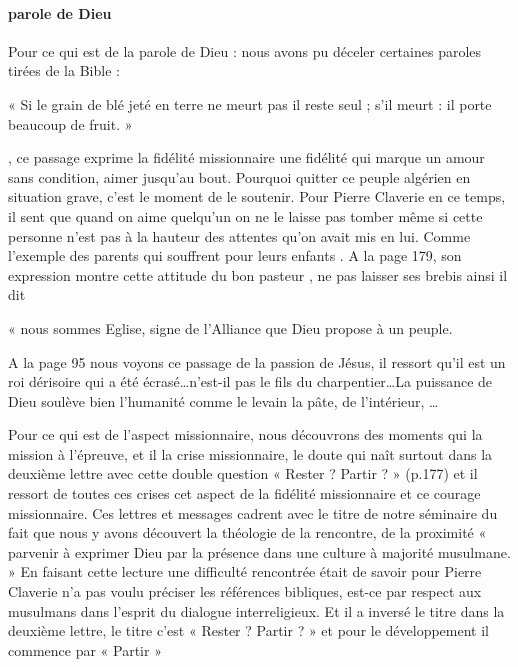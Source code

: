 \paragraph{parole de Dieu}
Pour ce qui est de la parole de Dieu : nous avons pu déceler certaines paroles tirées de la Bible : \begin{singlequote}
    « Si le grain de blé jeté en terre ne meurt pas il reste seul ; s’il meurt : il porte beaucoup de fruit. »
\end{singlequote}, ce passage exprime la fidélité missionnaire une fidélité qui marque un amour sans condition, aimer jusqu’au bout. Pourquoi quitter ce peuple algérien en situation grave, c’est le moment de le soutenir. Pour Pierre Claverie en ce temps, il sent que quand on aime quelqu’un on ne le laisse pas tomber même si cette personne n’est pas à la hauteur des attentes qu’on avait mis en lui. Comme l’exemple des parents qui souffrent pour leurs enfants . 
                 A la page 179, son expression montre cette attitude du bon pasteur , ne pas laisser ses brebis ainsi il dit \begin{singlequote}
                     « nous sommes Eglise, signe de l’Alliance que Dieu propose à un peuple. 
                 \end{singlequote}
                A la page 95 nous voyons ce passage de la passion de Jésus, il ressort qu’il est un roi dérisoire qui a été écrasé…n’est-il pas le fils du charpentier…La puissance de Dieu soulève bien l’humanité comme le levain la pâte, de l’intérieur, … 
                
Pour ce qui est de l’aspect missionnaire, nous découvrons des moments qui la mission à l’épreuve, et il la crise missionnaire, le doute qui naît surtout dans la deuxième lettre avec cette double question « Rester ? Partir ? » (p.177) et il ressort de toutes ces crises cet aspect de la fidélité missionnaire et ce courage missionnaire. 
                Ces lettres et messages cadrent avec le titre de notre séminaire du fait que nous y avons découvert la théologie de la rencontre, de la proximité « parvenir à exprimer Dieu par la présence dans une culture à majorité musulmane. »
               En faisant cette lecture une difficulté rencontrée était de savoir pour Pierre Claverie n’a pas voulu préciser les références bibliques, est-ce par respect aux musulmans dans l’esprit du dialogue interreligieux.  Et il a inversé le titre dans la deuxième lettre, le titre c’est « Rester ? Partir ? » et pour le développement il commence par « Partir »

